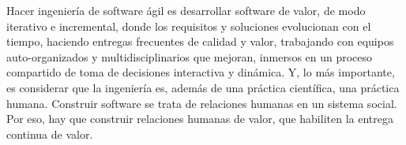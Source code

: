 Hacer ingeniería de software ágil es desarrollar software de valor, de modo iterativo e incremental, donde los requisitos y soluciones evolucionan con el tiempo, haciendo entregas frecuentes de calidad y valor, trabajando con equipos auto-organizados y multidisciplinarios que mejoran, inmersos en un proceso compartido de toma de decisiones interactiva y dinámica. Y, lo más importante, es considerar que la ingeniería es, además de una práctica científica, una práctica humana. Construir software se trata de relaciones humanas en un sistema social. Por eso, hay que construir relaciones humanas de valor, que habiliten la entrega continua de valor.
